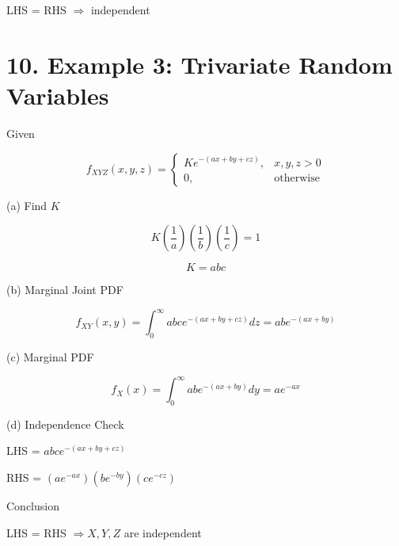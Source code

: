 \documentclass[12pt]{article}
\begin{document}
LHS = RHS $\Rightarrow$ independent

\section*{10. Example 3: Trivariate Random Variables}

Given

\[
f_{XYZ}(x,y,z)=
\begin{cases}
Ke^{-(ax+by+cz)}, & x,y,z>0 \\
0, & \text{otherwise}
\end{cases}
\]

(a) Find $K$

\[
K\left(\frac{1}{a}\right)\left(\frac{1}{b}\right)\left(\frac{1}{c}\right)=1
\]

\[
K=abc
\]

(b) Marginal Joint PDF

\[
f_{XY}(x,y)=\int_0^\infty abce^{-(ax+by+cz)}dz
=abe^{-(ax+by)}
\]

(c) Marginal PDF

\[
f_X(x)=\int_0^\infty abe^{-(ax+by)}dy
=ae^{-ax}
\]

(d) Independence Check

LHS = $abce^{-(ax+by+cz)}$

RHS = $(ae^{-ax})(be^{-by})(ce^{-cz})$

Conclusion

LHS = RHS $\Rightarrow X,Y,Z$ are independent
\end{document}
